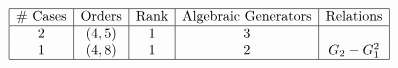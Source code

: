 \begin{table}[h]
	\centering
	$\begin{array}{|c|c|c|c|c|}
		\hline
		\text{\# Cases} & \text{Orders} & \text{Rank} & \text{Algebraic Generators} & \text{Relations} \\
		\hline
		2 & (4, 5) & 1 & 3 &  \\
		1 & (4, 8) & 1 & 2 & G_2 - G_1^2 \\
		\hline
	\end{array}$
\end{table}
